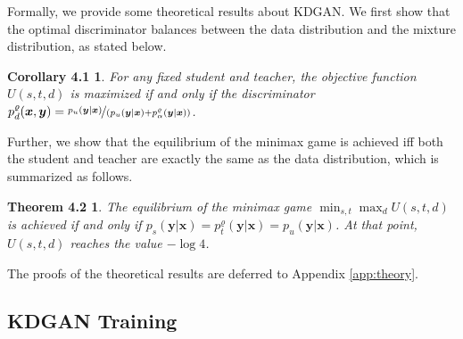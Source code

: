 \documentclass{article}
\newtheorem*{corollary1}{Corollary 4.1}
\newtheorem*{theorem1}{Theorem 4.2}
\newcommand{\OVEC}[1]{\bm{#1}} %
\newcommand{\kdganfullobj}{U(s,t,d)}
\newcommand{\kdganmin}{\min_{s,t}}
\newcommand{\kdganmax}{\max_{d}}
\newcommand{\fullpdat}{p_{u}(\OVEC{y}|\OVEC{x})}
\newcommand{\fullpstd}[1]{p_{s}(#1|\OVEC{x})}
\newcommand{\fullptch}[1]{p_{t}^{\varrho}(#1|\OVEC{x})}
\newcommand{\fullpdis}[1]{p_{d}^{\varrho}(\OVEC{x},#1)}
\newcommand{\fullpmix}{p_{\alpha}^{\varrho}(\OVEC{y}|\OVEC{x})}
\begin{document}
Formally, we provide some theoretical results about KDGAN.
We first show that the optimal discriminator balances between the data distribution and the mixture distribution, as stated below.
\begin{corollary1} \label{cor:optimal discriminator}
For any fixed student and teacher, the objective function $\kdganfullobj$ is maximized if and only if the discriminator $\fullpdis{\OVEC{y}}=\nicefrac{\fullpdat}{(\fullpdat+\fullpmix)}$.
\end{corollary1}%
Further, we show that the equilibrium of the minimax game is achieved iff both the student and teacher are exactly the same as the data distribution, which is summarized as follows.
\begin{theorem1} \label{thm:ideal equilibrium}
The equilibrium of the minimax game $\kdganmin\kdganmax\kdganfullobj$ is achieved if and only if $\fullpstd{\OVEC{y}}=\fullptch{\OVEC{y}}=\fullpdat$. At that point, $\kdganfullobj$ reaches the value $-\log 4$.
\end{theorem1}%

The proofs of the theoretical results are deferred to Appendix \ref{app:theory}.

\subsection{KDGAN Training} \label{sec:kdgan training}
\end{document}
